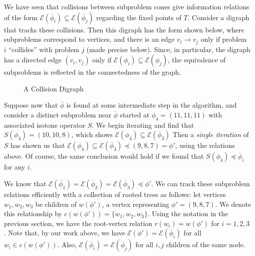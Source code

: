 \documentclass[11pt,reqno]{amsart}
\theoremstyle{definition}
\numberwithin{equation}{section}
\newcommand{\ol}{\overline}
\newcommand{\pre}{\phi}
\newcommand{\sub}{\subseteq}
\newcommand{\fix}{\mathcal{E}}
\newcommand{\peq}{\preceq}
\newcommand{\toppre}{\ol{\pre}}
\begin{document}
We have seen that collisions between subproblem cones give information relations of the form $\fix(\toppre_i) \sub \fix(\toppre_j)$ regarding the fixed points of $T$.
Consider a digraph that tracks these collisions.
Then this digraph has the form shown below, where subproblems correspond to vertices, and there is an edge $v_i \to v_j$ only if problem $i$ ``collides'' with problem $j$ (made precise below). 
Since, in particular, the digraph has a directed edge $(v_i,v_j)$ only if $\fix(\pre_i) \sub \fix(\pre_j)$, the equivalence of subproblems is reflected in the connectedness of the graph. 

\begin{figure} \label{fig:digraph}
\caption{A Collision Digraph}
\end{figure}

Suppose now that $\toppre$ is found at some intermediate step in the algorithm, and consider a distinct subproblem near $\toppre$ started at $\pre_4 = (11,11,11)$ with associated isotone operator $S$.
We begin iterating and find that $S(\pre_4) = (10,10,8)$, which shows $\fix(\pre_4) \sub \fix(\toppre_3)$ 
Then a \emph{single iteration} of $S$ has shown us that $\fix(\pre_4) \sub \fix(\toppre_3) \peq (9,8,7) = \pre'$, using the relations above. 
Of course, the same conclusion would hold if we found that  $S(\pre_4) \peq \toppre_i$ for any $i$. 

We know that $\fix(\toppre_1) = \fix(\toppre_2) = \fix(\toppre_3) \peq \pre'$. 
We can track these subproblem relations efficiently with a collection of rooted trees as follows: let vertices $w_1,w_2,w_3$ be children of $w(\pre')$, a vertex representing $\pre' = (9,8,7)$. 
We denote this relationship by $c(w(\pre')) = \{w_1,w_2,w_3\}$.
Using the notation in the previous section, we have the root-vertex relation $r(w_i) = w(\pre')$ for $i = 1,2,3$. 
Note that, by our work above, we have $\fix(\pre') = \fix(\toppre_i)$ for all $w_i \in c(w(\pre'))$. 
Also, $\fix(\toppre_i) = \fix(\toppre_j)$ for all $i,j$ children of the same node. 
\end{document}
